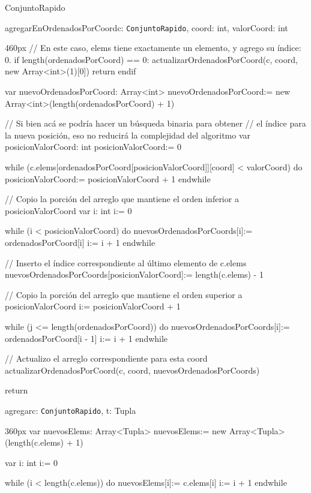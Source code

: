 \documentclass[10pt,a4paper]{article}
\begin{document}
\begin{ModuloImplements}{ConjuntoRapido}{{}}
\begin{proc}{agregarEnOrdenadosPorCoord}{\Inout c: \texttt{ConjuntoRapido}, \In coord: int, \In valorCoord: int}{}
\begin{ImplementationCode}{460px}
      // En este caso, elems tiene exactamente un elemento, y agrego su índice: 0.
      if length(ordenadosPorCoord) == 0:
        actualizarOrdenadosPorCoord(c, coord, new Array<int>(1)[0])
        return
      endif

      var nuevoOrdenadosPorCoord: Array<int>
          nuevoOrdenadosPorCoord:= new Array<int>(length(ordenadosPorCoord) + 1)

      // Si bien acá se podría hacer un búsqueda binaria para obtener
      // el índice para la nueva posición, eso no reducirá la complejidad del algoritmo
      var posicionValorCoord: int
          posicionValorCoord:= 0
      
      while (c.elems[ordenadosPorCoord[posicionValorCoord]][coord] < valorCoord) do
        posicionValorCoord:= posicionValorCoord + 1
      endwhile

      // Copio la porción del arreglo que mantiene el orden inferior a posicionValorCoord
      var i: int
          i:= 0

      while (i < posicionValorCoord) do
        nuevosOrdenadosPorCoords[i]:= ordenadosPorCoord[i]
        i:= i + 1
      endwhile

      // Inserto el índice correspondiente al último elemento de c.elems
      nuevosOrdenadosPorCoords[posicionValorCoord]:= length(c.elems) - 1

      // Copio la porción del arreglo que mantiene el orden superior a posicionValorCoord
      i:= posicionValorCoord + 1

      while (j <= length(ordenadosPorCoord)) do
        nuevosOrdenadosPorCoords[i]:= ordenadosPorCoord[i - 1]
        i:= i + 1
      endwhile
      
      // Actualizo el arreglo correspondiente para esta coord
      actualizarOrdenadosPorCoord(c, coord, nuevosOrdenadosPorCoords)

      return
    \end{ImplementationCode}
  \end{proc}
  \begin{proc}{agregar}{\Inout c: \texttt{ConjuntoRapido}, \In t: Tupla}{}
    \begin{ImplementationCode}{360px}
      var nuevosElems: Array<Tupla>
          nuevosElems:= new Array<Tupla>(length(c.elems) + 1)
      
      var i: int
          i:= 0

      while (i < length(c.elems)) do
        nuevosElems[i]:= c.elems[i]
        i:= i + 1
      endwhile


\end{ImplementationCode}
\end{proc}
\end{ModuloImplements}
\end{document}
